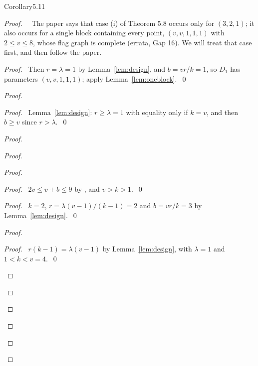 \begin{cgss}{Corollary}{5.11}\label{cor:5.11}
\end{cgss}
\begin{proof}
 \pfsketch\ \repair\ The paper says that case (i) of Theorem 5.8 occurs only for $(3,2,1)$; it
 also occurs for a single block containing every point, $(v,v,1,1,1)$ with $2\le v\le8$, whose
 flag graph is complete (errata, Gap 16). We will treat that case first, and then follow the
 paper.
 \begin{proof}\pf\ Then $r=\lambda=1$ by Lemma~\ref{lem:design}, and $b=vr/k=1$, so $D_1$ has
  parameters $(v,v,1,1,1)$; apply Lemma~\ref{lem:oneblock}.~\qed\end{proof}
 \begin{proof}
  \begin{proof}\pf\ Lemma~\ref{lem:design}: $r\ge\lambda=1$ with equality only if $k=v$, and
   then $b\ge v$ since $r>\lambda$.~\qed\end{proof}
  \begin{proof}
   \begin{proof}
    \begin{proof}
     \begin{proof}\pf\ $2v\le v+b\le9$ by , and $v>k>1$.~\qed\end{proof}
     \begin{proof}\pf\ $k=2$, $r=\lambda(v-1)/(k-1)=2$ and $b=vr/k=3$ by
      Lemma~\ref{lem:design}.~\qed\end{proof}
     \begin{proof}
      \begin{proof}\pf\ $r(k-1)=\lambda(v-1)$ by Lemma~\ref{lem:design}, with $\lambda=1$ and
       $1<k<v=4$.~\qed\end{proof}

\end{proof}
\end{proof}
\end{proof}
\end{proof}
\end{proof}
\end{proof}
